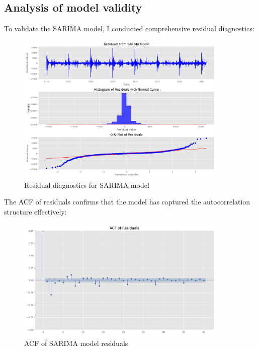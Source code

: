 \documentclass[11pt,a4paper]{article}
\begin{document}
\subsection{Analysis of model validity}

To validate the SARIMA model, I conducted comprehensive residual diagnostics:

\begin{figure}[H]
    \centering
    \includegraphics[width=0.9\textwidth]{plots/sarima/sarima_residual_diagnostics.png}
    \caption{Residual diagnostics for SARIMA model}
    \label{fig:sarima_residuals}
\end{figure}

The ACF of residuals confirms that the model has captured the autocorrelation structure effectively:

\begin{figure}[H]
    \centering
    \includegraphics[width=0.9\textwidth]{plots/sarima/sarima_residual_acf.png}
    \caption{ACF of SARIMA model residuals}
    \label{fig:sarima_residual_acf}
\end{figure}
\end{document}
